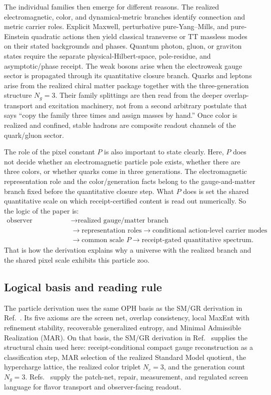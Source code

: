 \documentclass[11pt]{article}
\begin{document}
The individual families then emerge for different reasons. The realized electromagnetic, color,
and dynamical-metric branches identify connection and metric carrier roles. Explicit Maxwell,
perturbative pure-Yang--Mills, and pure-Einstein quadratic actions then yield classical transverse
or TT massless modes on their stated backgrounds and phases. Quantum photon, gluon, or graviton
states require the separate physical-Hilbert-space, pole-residue, and asymptotic/phase receipt. The weak bosons arise when
the electroweak gauge sector is propagated through its quantitative closure branch. Quarks and leptons arise from the
realized chiral matter package together with the three-generation structure \(N_g=3\). Their
family splittings are then read from the deeper overlap-transport and excitation machinery, not
from a second arbitrary postulate that says ``copy the family three times and assign masses by
hand.'' Once color is realized and confined, stable hadrons are composite readout channels of the
quark/gluon sector.

The role of the pixel constant \(P\) is also important to state clearly. Here, \(P\) does not
decide whether an electromagnetic particle pole exists, whether there are three colors, or whether
quarks come in three generations. The electromagnetic representation role and the color/generation
facts belong to the gauge-and-matter branch fixed before the quantitative closure step. What \(P\)
does is set the shared quantitative scale on which receipt-certified content is read out
numerically. So the logic of the paper is:
\[
\begin{aligned}
\text{observer consistency}
&\to
\text{realized gauge/matter branch} \\
&\to
\text{representation roles}
\to
\text{conditional action-level carrier modes} \\
&\to
\text{common scale }P
\to
\text{receipt-gated quantitative spectrum}.
\end{aligned}
\]
That is how the derivation explains why a universe with the realized branch and the
shared pixel scale exhibits this particle zoo.

\subsection{Logical basis and reading rule}

The particle derivation uses the same OPH basis as the SM/GR derivation in Ref.~\cite{ophcompact}. Its five
axioms are the screen net, overlap consistency, local MaxEnt with refinement stability,
recoverable generalized entropy, and Minimal Admissible Realization (MAR). On that basis, the
SM/GR derivation in Ref.~\cite{ophcompact} supplies the structural chain used here: receipt-conditional compact gauge reconstruction as a classification step, MAR selection of the realized
Standard Model quotient, the hypercharge lattice, the realized color triplet \(N_c=3\), and the generation count \(N_g=3\).
Refs.~\cite{ophconsensus,ophmicrophysics} supply the patch-net, repair, measurement, and
regulated screen language for flavor transport and observer-facing readout.
\end{document}
